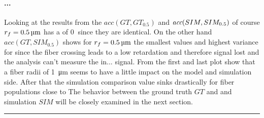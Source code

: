 \paragraph{...}
Looking at the results from the $acc(GT,GT_{0.5})$ and $\textit{acc}{}(SIM,SIM_{0.5})$ of course $\fiberRadius=\SI{0.5}{\micro\meter}$ has a \acc{} of $\SI{0}{}$ since they are identical.
On the other hand $acc(GT,SIM_{0.5})$ shows for $\fiberRadius=\SI{0.5}{\micro\meter}$ the smallest values and highest variance for \acc{} since the fiber crossing leads to a low retardation and therefore signal lost and the analysis can't measure the in... signal.
% 
From the first and last plot show that a fiber radii of \SI{1}{\micro\meter} seems to have a little impact on the model and simulation side.
After that the simulation comparison \acc{} value sinks drastically for fiber populations close to %
% 
The behavior between the ground truth $GT$ and and simulation $SIM$ will be closely examined in the next section.
\par
\noindent\rule{\textwidth}{2pt}
% 
\newpage
% 
% 
% 
